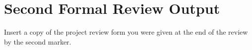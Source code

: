 \chapter{Second Formal Review Output}
\label{AppendixB}
Insert a copy of the project review form you were given at the end of the review by the second marker.
